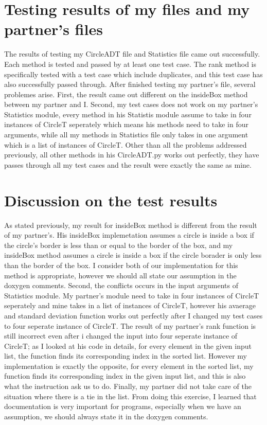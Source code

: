 \documentclass[12pt]{article}
\begin{document}
\lstset{language=Python}

\noindent 

\newpage

\section*{Testing results of my files and my partner's files}
The results of testing my CircleADT file and Statistics file came out successfully.
Each method is tested and passed by at least one test case. The rank method
is specifically tested with a test case which include duplicates, and this test case
has also successfully passed through. After finished testing my partner's file, 
several problemes  arise. First, the result came out different on the insideBox 
method between my partner and I. Second, my test cases does not work on my
partner's Statistics module, every method in his Statistis module assume to take
in four instances of CircleT seperately which means his methods need to take in 
four arguments, while all my methods in Statistics file only takes in one argument 
which is a list of instances of CircleT. Other than all the problems addressed 
previously, all other methods in his CircleADT.py works out perfectly, they have
passes through all my test cases and the result were exactly the same as mine.


\section*{Discussion on the test results}
As stated previously,  my result for insideBox method is different from the result 
of my partner's. His insideBox implemetation assumes a circle is inside a box if the 
circle's border is less than or equal to the border of the box, and my insideBox method 
assumes a circle is inside a box if the circle borader is only less than the border of the box.  
I consider both of our implementation for this method is appropriate, however we should 
all state our assumption in the doxygen comments.  Second, the conflicts occurs in the 
input arguments of Statistics module. My partner's module need to take in four instances 
of CircleT seperately and mine takes in a list of instances of CircleT, however his avaerage 
and standard deviation function works out perfectly after I changed my test cases to 
four seperate instance of CircleT. The result of my partner's rank function is still incorrect 
even after i changed the input into four seperate instance of CircleT; as I looked at his 
code in details, for every element in the given input list, the function finds its corresponding 
index in the sorted  list. However my implementation is exactly the opposite, for every 
element in the sorted list, my function finds its corresponding index in the given input list, 
and this is also what the instruction ask us to do. Finally, my partner did not take care of 
the situation where there is a tie in the list. From doing this exercise, I learned that 
documentation is very important for programs, especially when we have an assumption,
we should always state it in the doxygen comments.
\end{document}
